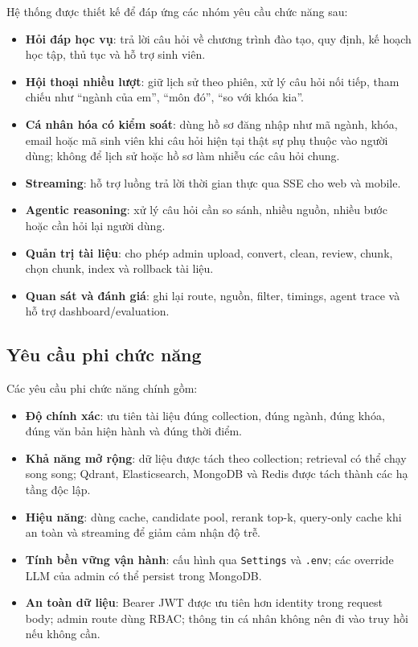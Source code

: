 \documentclass[../DoAn.tex]{subfiles}
\begin{document}
Hệ thống được thiết kế để đáp ứng các nhóm yêu cầu chức năng sau:

\begin{itemize}
    \item \textbf{Hỏi đáp học vụ}: trả lời câu hỏi về chương trình đào tạo, quy
    định, kế hoạch học tập, thủ tục và hỗ trợ sinh viên.
    \item \textbf{Hội thoại nhiều lượt}: giữ lịch sử theo phiên, xử lý câu hỏi
    nối tiếp, tham chiếu như ``ngành của em'', ``môn đó'', ``so với khóa kia''.
    \item \textbf{Cá nhân hóa có kiểm soát}: dùng hồ sơ đăng nhập như mã ngành,
    khóa, email hoặc mã sinh viên khi câu hỏi hiện tại thật sự phụ thuộc vào
    người dùng; không để lịch sử hoặc hồ sơ làm nhiễu các câu hỏi chung.
    \item \textbf{Streaming}: hỗ trợ luồng trả lời thời gian thực qua SSE cho
    web và mobile.
    \item \textbf{Agentic reasoning}: xử lý câu hỏi cần so sánh, nhiều nguồn,
    nhiều bước hoặc cần hỏi lại người dùng.
    \item \textbf{Quản trị tài liệu}: cho phép admin upload, convert, clean,
    review, chunk, chọn chunk, index và rollback tài liệu.
    \item \textbf{Quan sát và đánh giá}: ghi lại route, nguồn, filter, timings,
    agent trace và hỗ trợ dashboard/evaluation.
\end{itemize}

\subsection{Yêu cầu phi chức năng}

Các yêu cầu phi chức năng chính gồm:

\begin{itemize}
    \item \textbf{Độ chính xác}: ưu tiên tài liệu đúng collection, đúng ngành,
    đúng khóa, đúng văn bản hiện hành và đúng thời điểm.
    \item \textbf{Khả năng mở rộng}: dữ liệu được tách theo collection; retrieval
    có thể chạy song song; Qdrant, Elasticsearch, MongoDB và Redis được tách
    thành các hạ tầng độc lập.
    \item \textbf{Hiệu năng}: dùng cache, candidate pool, rerank top-k, query-only
    cache khi an toàn và streaming để giảm cảm nhận độ trễ.
    \item \textbf{Tính bền vững vận hành}: cấu hình qua \texttt{Settings} và
    \texttt{.env}; các override LLM của admin có thể persist trong MongoDB.
    \item \textbf{An toàn dữ liệu}: Bearer JWT được ưu tiên hơn identity trong
    request body; admin route dùng RBAC; thông tin cá nhân không nên đi vào
    truy hồi nếu không cần.
\end{itemize}
\end{document}
